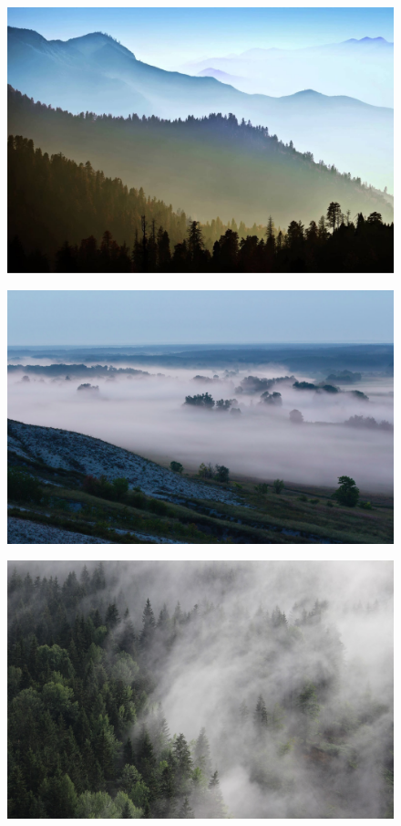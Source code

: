 \begin{figure}[H]
    \centering
    \includegraphics[width=\linewidth]{fogs/fog04.jpg} 
    \caption{}
    \label{fig:r4}
\end{figure}

\begin{figure}[H]
    \centering
    \includegraphics[width=\linewidth]{fogs/fog05.jpg} 
    \caption{}
    \label{fig:r5}
\end{figure}

\begin{figure}[H]
    \centering
    \includegraphics[width=\linewidth]{fogs/fog06.jpg} 
    \caption{}
    \label{fig:r6}
\end{figure}

